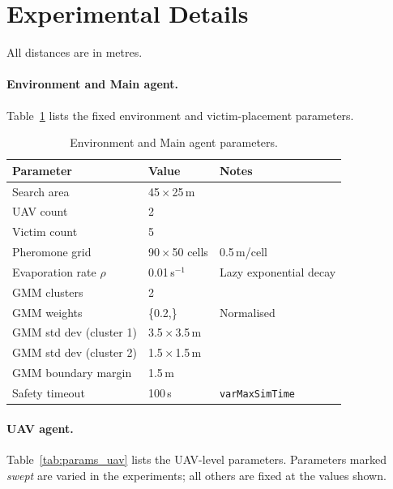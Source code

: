 \section{Experimental Details}

All distances are in metres.

\paragraph{Environment and Main agent.}
Table~\ref{tab:params_main} lists the fixed environment and victim-placement parameters.

\begin{table}[h]
\centering
\caption{Environment and Main agent parameters.}
\label{tab:params_main}
\begin{tabular}{lll}
\toprule
Parameter & Value & Notes \\
\midrule
Search area            & 45\,$\times$\,25\,m         & \\
UAV count              & 2                           & \\
Victim count           & 5                           & \\
Pheromone grid         & 90\,$\times$\,50 cells      & 0.5\,m/cell \\
Evaporation rate $\rho$& 0.01\,s$^{-1}$              & Lazy exponential decay \\
GMM clusters           & 2                           & \\
GMM weights            & \{0.2,\;0.5\}               & Normalised \\
GMM std dev (cluster 1)& 3.5\,$\times$\,3.5\,m       & \\
GMM std dev (cluster 2)& 1.5\,$\times$\,1.5\,m       & \\
GMM boundary margin    & 1.5\,m                      & \\
Safety timeout         & 100\,s                      & \texttt{varMaxSimTime} \\
\bottomrule
\end{tabular}
\end{table}

\paragraph{UAV agent.}
Table~\ref{tab:params_uav} lists the UAV-level parameters. Parameters marked
\emph{swept} are varied in the experiments; all others are fixed at the values shown.


